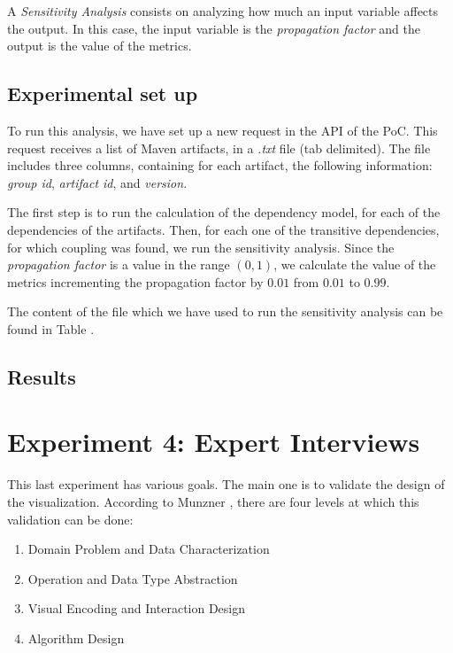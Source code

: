 A \textit{Sensitivity Analysis} consists on analyzing how much an input variable affects the output. In this case, the input variable is the \textit{propagation factor} and the output is the value of the metrics.

\subsection{Experimental set up}

To run this analysis, we have set up a new request in the API of the PoC. This request receives a list of Maven artifacts, in a \textit{.txt} file (tab delimited). The file includes three columns, containing for each artifact, the following information: \textit{group id}, \textit{artifact id}, and \textit{version}.

The first step is to run the calculation of the dependency model, for each of the dependencies of the artifacts. Then, for each one of the transitive dependencies, for which coupling was found, we run the sensitivity analysis. Since the \textit{propagation factor} is a value in the range $(0,1)$, we calculate the value of the metrics incrementing the propagation factor by $0.01$ from $0.01$ to $0.99$.

The content of the file which we have used to run the sensitivity analysis can be found in Table .

\subsection{Results}

\section{Experiment 4: Expert Interviews}
This last experiment has various goals. The main one is to validate the design of the visualization. According to Munzner \cite{Munzner2009}, there are four levels at which this validation can be done:

\begin{enumerate}
  \item Domain Problem and Data Characterization
  \item Operation and Data Type Abstraction
  \item Visual Encoding and Interaction Design
  \item Algorithm Design
\end{enumerate}

